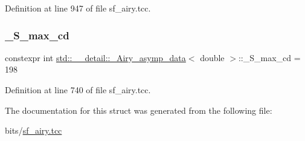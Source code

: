 Definition at line 947 of file sf\+\_\+airy.\+tcc.

\mbox{\label{structstd_1_1____detail_1_1__Airy__asymp__data_3_01double_01_4_a38e485184d2762e83a27937efc343d01}} 
\subsubsection{\texorpdfstring{\+\_\+\+S\+\_\+max\+\_\+cd}{\_S\_max\_cd}}
{\footnotesize\ttfamily constexpr int \hyperlink{structstd_1_1____detail_1_1__Airy__asymp__data}{std\+::\+\_\+\+\_\+detail\+::\+\_\+\+Airy\+\_\+asymp\+\_\+data}$<$ double $>$\+::\+\_\+\+S\+\_\+max\+\_\+cd = 198\hspace{0.3cm}{\ttfamily [static]}}



Definition at line 740 of file sf\+\_\+airy.\+tcc.



The documentation for this struct was generated from the following file\+:\begin{DoxyCompactItemize}
\item 
bits/\hyperlink{sf__airy_8tcc}{sf\+\_\+airy.\+tcc}\end{DoxyCompactItemize}
